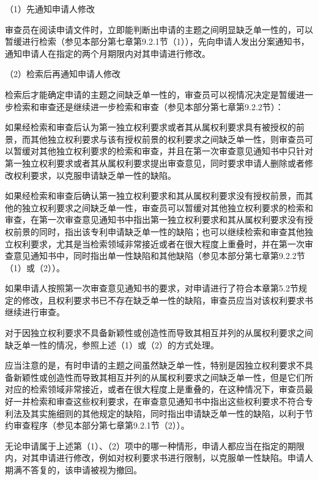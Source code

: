 {\setlength{\parindent}{17.1bp}（1）先通知申请人修改\par}

审查员在阅读申请文件时，立即能判断出申请的主题之间明显缺乏单一性的，可以暂缓进行检索（参见本部分第七章第9.2.1节（1）），先向申请人发出分案通知书，通知申请人在指定的两个月期限内对其申请进行修改。

{\setlength{\parindent}{17.1bp}（2）检索后再通知申请人修改\par}

检索后才能确定申请的主题之间缺乏单一性的，审查员可以视情况决定是暂缓进一步检索和审查还是继续进一步检索和审查（参见本部分第七章第9.2.2节）：

如果经检索和审查后认为第一独立权利要求或者其从属权利要求具有被授权的前景，而其他独立权利要求与该有授权前景的权利要求之间缺乏单一性，则审查员可以暂缓对其他独立权利要求的检索和审查，并且在第一次审查意见通知书中只针对第一独立权利要求或者其从属权利要求提出审查意见，同时要求申请人删除或者修改权利要求，以克服申请缺乏单一性的缺陷。

如果经检索和审查后确认第一独立权利要求和其从属权利要求没有授权前景，而其他的独立权利要求之间缺乏单一性，审查员可以暂缓对其他独立权利要求的检索和审查，在第一次审查意见通知书中指出第一独立权利要求和其从属权利要求没有授权前景的同时，指出该专利申请缺乏单一性的缺陷；也可以继续检索和审查其他独立权利要求，尤其是当检索领域非常接近或者在很大程度上重叠时，并在第一次审查意见通知书中，同时指出单一性缺陷和其他缺陷（参见本部分第七章第9.2.2节（1）或（2））。

如果申请人按照第一次审查意见通知书的要求，对申请进行了符合本章第5.2节规定的修改，且权利要求书已不存在缺乏单一性的缺陷，审查员应当对该权利要求书继续进行审查。

对于因独立权利要求不具备新颖性或创造性而导致其相互并列的从属权利要求之间缺乏单一性的情况，参照上述（1）或（2）的方式处理。

应当注意的是，有时申请的主题之间虽然缺乏单一性，特别是因独立权利要求不具备新颖性或创造性而导致其相互并列的从属权利要求之间缺乏单一性，但是它们所对应的检索领域非常接近，或者在很大程度上是重叠的，在这种情况下，审查员最好一并检索和审查这些权利要求，在审查意见通知书中指出这些权利要求不符合专利法及其实施细则的其他规定的缺陷，同时指出申请缺乏单一性的缺陷，以利于节约审查程序（参见本部分第七章第9.2.1节（2））。

无论申请属于上述第（1）、（2）项中的哪一种情形，申请人都应当在指定的期限内，对其申请进行修改，例如对权利要求书进行限制，以克服单一性缺陷。申请人期满不答复的，该申请被视为撤回。

